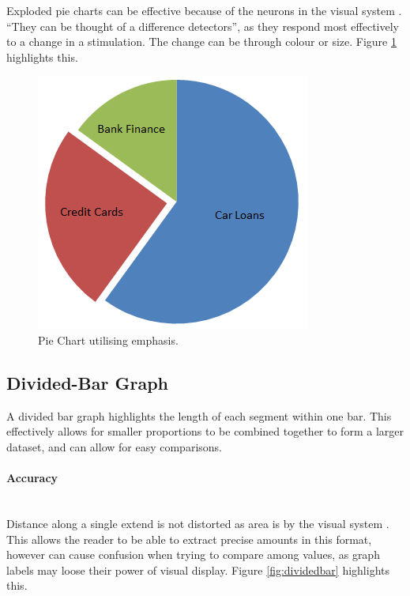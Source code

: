 Exploded pie charts can be effective because of the neurons in the visual 
system \citep{kosslyn06}. ``They can be thought of a difference detectors'', as
they respond most effectively to a change in a stimulation. The change can be
through colour or size. Figure \ref{fig:pieemphasis} highlights this.

\begin{figure}[H]
  \centering
    \includegraphics[scale=1]{chapter3/visualisation/pie_chart_emphasize.png}
  \caption{Pie Chart utilising emphasis.}
  \label{fig:pieemphasis}
\end{figure}


\subsection{Divided-Bar Graph}
A divided bar graph highlights the length of each segment within one bar. This 
effectively allows for smaller proportions to be combined together to form a 
larger dataset, and can allow for easy comparisons.

\paragraph{Accuracy} ~\\
Distance along a single extend is not distorted as area is by the visual system
\citep{kosslyn06}. This allows the reader to be able to extract precise amounts
in this format, however can cause confusion when trying to compare among 
values, as graph labels may loose their power of visual display.
Figure \ref{fig:dividedbar} highlights this.

